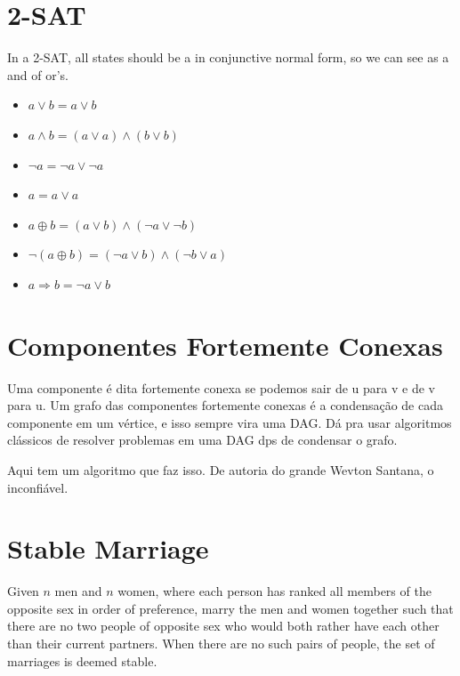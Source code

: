        
    \section{2-SAT}
    In a 2-SAT, all states should be a in conjunctive normal form, so we can see as a and of or's.

    \begin{itemize}
        \item $ a \lor b = a \lor b$
        \item $ a \land b = (a \lor a) \land (b \lor b)$
        \item $ \neg a = \neg a \lor \neg a$
        \item $ a = a \lor a$
        \item $ a \oplus b = (a \lor b) \land (\neg a \lor \neg b)$
        \item $ \neg (a \oplus b) = (\neg a \lor b) \land (\neg b \lor a)$
        \item $ a \Rightarrow b = \neg a \lor b$
    \end{itemize}
    
    

    \section{Componentes Fortemente Conexas}

    Uma componente é dita fortemente conexa se podemos sair de u para v e de v para u. Um grafo das componentes fortemente conexas é a condensação de cada componente em um vértice, e isso sempre vira uma DAG. Dá pra usar algoritmos clássicos de resolver problemas em uma DAG dps de condensar o grafo.

    Aqui tem um algoritmo que faz isso. De autoria do grande Wevton Santana, o inconfiável.
    
    

    \section{Stable Marriage}

    Given $n$ men and $n$ women, where each person has ranked all members of the opposite sex in order of preference, marry the men and women together such that there are no two people of opposite sex who would both rather have each other than their current partners. When there are no such pairs of people, the set of marriages is deemed stable.
    
